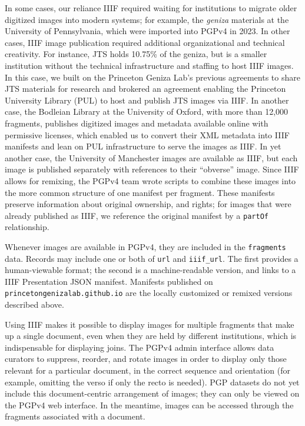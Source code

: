\documentclass{article}
\begin{document}
In some cases, our reliance  IIIF required waiting for institutions to migrate older digitized images into modern systems; for example, the\textit{ geniza} materials at the University of Pennsylvania, which were imported into PGPv4 in 2023.  In other cases, IIIF image publication required additional organizational and technical creativity. 
For instance, JTS holds 10.75\% of the geniza, but is a smaller institution without the technical infrastructure and staffing to host IIIF images. In this case, we built on the Princeton Geniza Lab’s previous agreements to share JTS materials for research and brokered an agreement enabling the Princeton University Library (PUL) to host and publish JTS images via IIIF. In another case, the Bodleian Library at the University of Oxford, with more than 12,000 fragments, publishes digitized images and metadata available online with permissive licenses, which enabled us to convert their XML metadata into IIIF manifests and lean on  PUL infrastructure to serve the images as IIIF. In yet another case, the University of Manchester images are available as IIIF, but each image is published separately with references to their “obverse” image. Since IIIF allows for remixing, the PGPv4 team wrote scripts to combine these images into the more common structure of one manifest per fragment. These manifests preserve information about original ownership, and rights; for images that were already published as IIIF, we reference the original manifest by a \texttt{partOf} relationship.

Whenever images are available in PGPv4, they are included in the \texttt{fragments} data. Records may include one or both of \texttt{url} and \texttt{iiif\_url}. The first provides a human-viewable format; the second is a machine-readable version, and links to a IIIF Presentation JSON manifest. Manifests published on \texttt{princetongenizalab.github.io} are the locally customized or remixed versions described above.

Using IIIF makes it possible to display images for multiple fragments that make up a single document, even when they are held by different institutions, which is indispensable for displaying joins. The PGPv4 admin interface allows data curators to suppress, reorder, and rotate images in order to display only those relevant for a particular document, in the correct sequence and orientation (for example, omitting the verso if only the recto is needed). PGP datasets do not yet include this document-centric arrangement of images; they can only be viewed on the PGPv4 web interface. In the meantime, images can be accessed through the fragments associated with a document.
\end{document}
